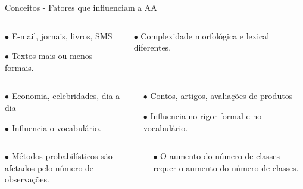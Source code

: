 \begin{frame}{Conceitos - Fatores que influenciam a AA}

\begin{columns}
	\begin{column}{0.48\textwidth}
		\begin{tcolorbox}[title=Canal,height=2.4cm,valign=center]\selectFont
			$\bullet$ E-mail, jornais, livros, SMS
			
			$\bullet$ Textos mais ou menos formais.                    
		\end{tcolorbox}
	\end{column}
	\begin{column}{0.48\textwidth}
		\begin{tcolorbox}[title=Idioma,height=2.4cm,valign=center]\selectFont
			$\bullet$ Complexidade morfológica e lexical diferentes.
		\end{tcolorbox}
	\end{column}
\end{columns}
\begin{columns}
	\begin{column}{0.48\textwidth}
		\begin{tcolorbox}[title=Tópico,height=2.4cm,valign=center]\selectFont
			$\bullet$ Economia, celebridades, dia-a-dia
			
			$\bullet$ Influencia o vocabulário.                    
		\end{tcolorbox}
	\end{column}
	\begin{column}{0.48\textwidth}
		\begin{tcolorbox}[title=Domínio ou Gênero do texto,height=2.4cm,valign=center]\selectFont
			$\bullet$ Contos, artigos, avaliações de produtos
			
			$\bullet$ Influencia no rigor formal e no vocabulário.
		\end{tcolorbox}
	\end{column}
\end{columns}

\begin{columns}
	\begin{column}{0.48\textwidth}
	\begin{tcolorbox}[title=Tamanho do texto,height=2.4cm,valign=center]
		$\bullet$ Métodos probabilísticos são afetados pelo número de observações.                  
	\end{tcolorbox}
	\end{column}
	\begin{column}{0.48\textwidth}
	\begin{tcolorbox}[title=Número de autores,height=2.4cm,valign=center]
		$\bullet$ O aumento do número de classes requer o aumento do número de classes.                    
	\end{tcolorbox}
	\end{column}
\end{columns}

\end{frame}






